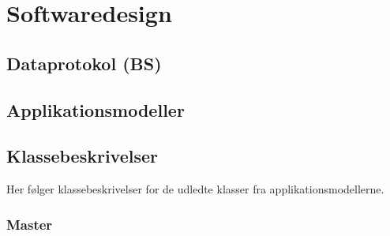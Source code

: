 \chapter{Softwaredesign}

\section{Dataprotokol (BS)}


\section{Applikationsmodeller}


\section{Klassebeskrivelser}
Her følger klassebeskrivelser for de udledte klasser fra applikationsmodellerne.

\subsection{Master}
